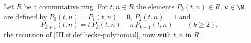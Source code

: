 Let $R$ be a commutative ring. For $t,n\in R$ the elements $P_k(t,n)\in R$, $k\in\N$, are defined by $P_0(t,n)=P_1(t,n)=0$,
$P_2(t,n)=1$ and
\[
  P_{k+1}(t,n)=t\,P_k(t,n)-n\,P_{k-1}(t,n)\qquad(k\ge2),
\]
the recursion of \cref{III.ef.def:hecke-polynomial}, now with $t,n$ in $R$.
